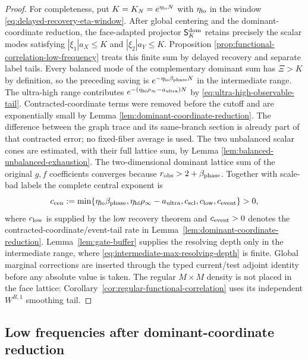 \documentclass[11pt]{article}
\begin{document}
\begin{proof}
For completeness, put $K=K_N=e^{\eta_{\rm lo}N}$ with
$\eta_{\rm lo}$ in the window
\eqref{eq:delayed-recovery-eta-window}.  After global centering and the
dominant-coordinate reduction, the face-adapted projector
$\mathsf S_K^{\rm dom}$ retains precisely the scalar modes satisfying
$|\xi_1|a_X\le K$ and $|\xi_2|a_Y\le K$.  Proposition
\ref{prop:functional-correlation-low-frequency} treats this finite sum by
delayed recovery and separate label tails.  Every balanced mode of the complementary dominant
sum has $\Xi>K$ by definition, so the preceding saving is
$e^{-\eta_{\rm lo}\beta_{\rm phase}N}$ in the intermediate range.  The
ultra-high range contributes
$e^{-(\eta_{\rm hi}\rho_\infty-a_{\rm ultra})N}$ by
\eqref{eq:ultra-high-observable-tail}.  Contracted-coordinate terms were removed before
the cutoff and are exponentially small by Lemma
\ref{lem:dominant-coordinate-reduction}.  The difference between the graph
trace and its same-branch section is already part of that contracted error;
no fixed-fiber average is used.  The two unbalanced scalar cones are
estimated, with their full lattice sum, by Lemma
\ref{lem:balanced-unbalanced-exhaustion}.  The two-dimensional dominant
lattice sum of the original $g,f$ coefficients converges because
\(r_{\rm obs}>2+\beta_{\rm phase}\).  Together with scale-bad labels the
complete central exponent is
\begin{equation}
\label{eq:complete-central-exponent}
 c_{\rm cen}:=\min\{\eta_{\rm lo}\beta_{\rm phase},
 \eta_{\rm hi}\rho_\infty-a_{\rm ultra},c_{\rm scl},
 c_{\rm low},c_{\rm event}\}>0,
\end{equation}
where $c_{\rm low}$ is supplied by the low recovery theorem and
$c_{\rm event}>0$ denotes the contracted-coordinate/event-tail rate in
Lemma~\ref{lem:dominant-coordinate-reduction}.  Lemma~\ref{lem:gate-buffer} supplies the
resolving depth only in the intermediate range, where
\eqref{eq:intermediate-max-resolving-depth} is finite.  Global marginal corrections are inserted through the typed
current/test adjoint identity before any absolute value is taken.  The
regular $M\times M$ density is not placed in the face lattice:
Corollary~\ref{cor:regular-functional-correlation} uses its independent
$W^{R,1}$ smoothing tail.
\end{proof}

\subsection{Low frequencies after dominant-coordinate reduction}
\end{document}
